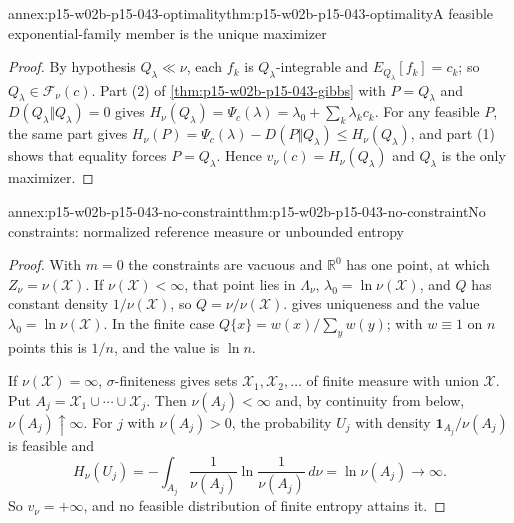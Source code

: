 \begin{annexitem}{annex:p15-w02b-p15-043-optimality}{thm:p15-w02b-p15-043-optimality}{A feasible exponential-family member is the unique maximizer}
\begin{proof}
By hypothesis \(Q_\lambda\ll\nu\), each \(f_k\) is \(Q_\lambda\)-integrable and
\(E_{Q_\lambda}[f_k]=c_k\); so \(Q_\lambda\in\mathcal F_\nu(c)\). Part (2) of
\cref{thm:p15-w02b-p15-043-gibbs} with \(P=Q_\lambda\) and
\(D(Q_\lambda\Vert Q_\lambda)=0\) gives
\(H_\nu(Q_\lambda)=\Psi_c(\lambda)=\lambda_0+\sum_k\lambda_kc_k\).
For any feasible \(P\), the same part gives
\(H_\nu(P)=\Psi_c(\lambda)-D(P\Vert Q_\lambda)\leq H_\nu(Q_\lambda)\), and
part (1) shows that equality forces \(P=Q_\lambda\). Hence
\(v_\nu(c)=H_\nu(Q_\lambda)\) and \(Q_\lambda\) is the only maximizer.
\end{proof}
\end{annexitem}

\begin{annexitem}{annex:p15-w02b-p15-043-no-constraint}{thm:p15-w02b-p15-043-no-constraint}{No constraints: normalized reference measure or unbounded entropy}
\begin{proof}
With \(m=0\) the constraints are vacuous and \(\mathbb R^0\) has one point,
at which \(Z_\nu=\nu(\mathcal X)\). If \(\nu(\mathcal X)<\infty\), that point
lies in \(\Lambda_\nu\), \(\lambda_0=\ln\nu(\mathcal X)\), and \(Q\) has
constant density \(1/\nu(\mathcal X)\), so \(Q=\nu/\nu(\mathcal X)\).
 gives uniqueness and the value
\(\lambda_0=\ln\nu(\mathcal X)\). In the finite case
\(Q\{x\}=w(x)/\sum_yw(y)\); with \(w\equiv1\) on \(n\) points this is
\(1/n\), and the value is \(\ln n\).

If \(\nu(\mathcal X)=\infty\), \(\sigma\)-finiteness gives sets
\(\mathcal X_1,\mathcal X_2,\ldots\) of finite measure with union
\(\mathcal X\). Put \(A_j=\mathcal X_1\cup\cdots\cup\mathcal X_j\). Then
\(\nu(A_j)<\infty\) and, by continuity from below,
\(\nu(A_j)\uparrow\infty\). For \(j\) with \(\nu(A_j)>0\), the probability
\(U_j\) with density \(\mathbf 1_{A_j}/\nu(A_j)\) is feasible and
\[
 H_\nu(U_j)=-\int_{A_j}\frac1{\nu(A_j)}\ln\frac1{\nu(A_j)}\,d\nu=\ln\nu(A_j)\to\infty .
\]
So \(v_\nu=+\infty\), and no feasible distribution of finite entropy attains it.
\end{proof}
\end{annexitem}

